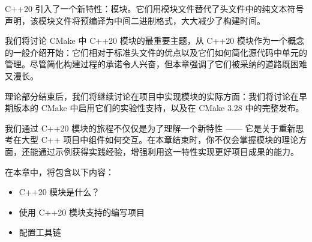 C++20 引入了一个新特性：模块。它们用模块文件替代了头文件中的纯文本符号声明，该模块文件将预编译为中间二进制格式，大大减少了构建时间。

我们将讨论 CMake 中 C++20 模块的最重要主题，从 C++20 模块作为一个概念的一般介绍开始：它们相对于标准头文件的优点以及它们如何简化源代码中单元的管理。尽管简化构建过程的承诺令人兴奋，但本章强调了它们被采纳的道路既困难又漫长。

理论部分结束后，我们将继续讨论在项目中实现模块的实际方面：我们将讨论在早期版本的 CMake 中启用它们的实验性支持，以及在 CMake 3.28 中的完整发布。

我们通过 C++20 模块的旅程不仅仅是为了理解一个新特性 —— 它是关于重新思考在大型 C++ 项目中组件如何交互。在本章结束时，你不仅会掌握模块的理论方面，还能通过示例获得实践经验，增强利用这一特性实现更好项目成果的能力。

在本章中，将包含以下内容：

\begin{itemize}
\item
C++20 模块是什么？

\item
使用 C++20 模块支持的编写项目

\item
配置工具链
\end{itemize}














